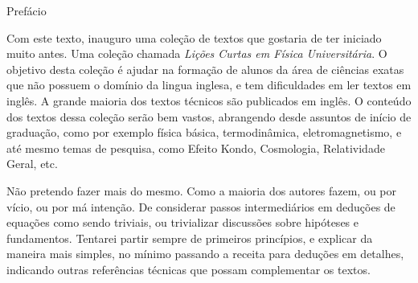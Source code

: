 \thispagestyle{empty}
{\Huge Prefácio}

\vspace{1cm}
Com este texto, inauguro uma coleção de textos que gostaria de ter
iniciado muito antes. Uma coleção chamada {\it Lições Curtas em
Física Universitária}. O objetivo desta coleção é ajudar na formação
de alunos da área de ciências exatas que não possuem o domínio da 
lingua inglesa, e tem dificuldades em ler textos em inglês. A grande
maioria dos textos técnicos são publicados em inglês. O conteúdo
dos textos dessa coleção serão bem vastos, abrangendo desde assuntos
de início de graduação, como por exemplo física básica, termodinâmica,
eletromagnetismo, e até mesmo temas de pesquisa, como Efeito Kondo,
Cosmologia, Relatividade Geral, etc.

Não pretendo fazer mais do mesmo. Como a maioria dos autores fazem,
ou por vício, ou por má intenção. De considerar passos intermediários
em deduções de equações como sendo triviais, ou trivializar discussões
sobre hipóteses e fundamentos. Tentarei partir sempre de primeiros
princípios, e explicar da maneira mais simples, no mínimo passando a
receita para deduções em detalhes, indicando outras referências 
técnicas que possam complementar os textos.
